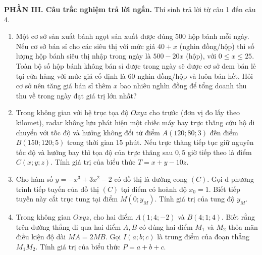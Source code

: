 \documentclass[12pt]{article}
\begin{document}
	\vspace{6mm}
	\noindent\textbf{PHẦN III. Câu trắc nghiệm trả lời ngắn.} Thí sinh trả lời từ câu 1 đến câu 4.
	\vspace{3mm}
	
	\begin{enumerate}[label=\textbf{Câu \arabic*.}, leftmargin=*]
		
		\item Một cơ sở sản xuất bánh ngọt sản xuất được đúng $500$ hộp bánh mỗi ngày. Nếu cơ sở bán sỉ cho các siêu thị với mức giá $40 + x$ (nghìn đồng/hộp) thì số lượng hộp bánh siêu thị nhập trong ngày là $500 - 20x$ (hộp), với $0 \le x \le 25$. Toàn bộ số hộp bánh không bán sỉ được trong ngày sẽ được cơ sở đem bán lẻ tại cửa hàng với mức giá cố định là $60$ nghìn đồng/hộp và luôn bán hết. Hỏi cơ sở nên tăng giá bán sỉ thêm $x$ bao nhiêu nghìn đồng để tổng doanh thu thu về trong ngày đạt giá trị lớn nhất?
		\vspace{4mm}
		
		\item Trong không gian với hệ trục tọa độ $Oxyz$ cho trước (đơn vị đo lấy theo kilomet), radar không lưu phát hiện một chiếc máy bay trực thăng cứu hộ di chuyển với tốc độ và hướng không đổi từ điểm $A(120; 80; 3)$ đến điểm $B(150; 120; 5)$ trong thời gian $15$ phút. Nếu trực thăng tiếp tục giữ nguyên tốc độ và hướng bay thì tọa độ của trực thăng sau $0,5$ giờ tiếp theo là điểm $C(x; y; z)$. Tính giá trị của biểu thức $T = x + y - 10z$.
		\vspace{4mm}
		
		\item Cho hàm số $y = -x^3 + 3x^2 - 2$ có đồ thị là đường cong $(C)$. Gọi d phương trình tiếp tuyến của đồ thị $(C)$ tại điểm có hoành độ $x_0 = 1$. Biết tiếp tuyến này cắt trục tung tại điểm $M(0; y_M)$. Tính giá trị của tung độ $y_M$.
		\vspace{4mm}
		
		\item Trong không gian $Oxyz$, cho hai điểm $A(1; 4; -2)$ và $B(4; 1; 4)$. Biết rằng trên đường thẳng đi qua hai điểm $A, B$ có đúng hai điểm $M_1$ và $M_2$ thỏa mãn điều kiện độ dài $MA = 2MB$. Gọi $I(a; b; c)$ là trung điểm của đoạn thẳng $M_1M_2$. Tính giá trị của biểu thức $P = a + b + c$.
		
		
	\end{enumerate}
	
\end{document}
